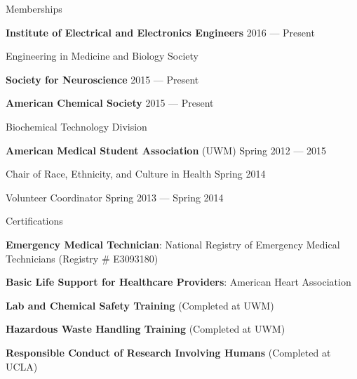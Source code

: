 \documentclass[10pt, oneside]{article}
\begin{document}
\begin{cvlist}{Memberships} %
\vspace{-2mm}
\item \textbf{Institute of Electrical and Electronics Engineers} \hfill{2016 --- Present}
	\item \hspace{9mm} Engineering in Medicine and Biology Society 

	\item \textbf{Society for Neuroscience} \hfill{2015 --- Present}
	\item \hspace{-1.5mm}  \textbf{American Chemical Society} \hfill{2015 --- Present}
	\item \hspace{9mm} Biochemical Technology Division
	\item \textbf{American Medical Student Association}  (UWM) \hfill{Spring 2012 --- 2015} 
	\item \hspace{10mm}Chair of Race, Ethnicity, and Culture in Health \hfill{Spring 2014}  
	\item \hspace{10mm}Volunteer Coordinator \hfill{Spring 2013 --- Spring 2014}
		
	
\end{cvlist}
\vspace{-10mm}
\begin{cvlist}{Certifications}
	\vspace{-1mm}
	\item  \textbf{Emergency Medical Technician}: National Registry of Emergency Medical Technicians (Registry \# E3093180)
	\item  \textbf{Basic Life Support for Healthcare Providers}: American Heart Association
	\item  \textbf{Lab and Chemical Safety Training} (Completed at UWM)
	\item  \textbf{Hazardous Waste Handling Training} (Completed at UWM) 
	\item \textbf{Responsible Conduct of Research Involving Humans} (Completed at UCLA)
\end{cvlist}
\end{document}

